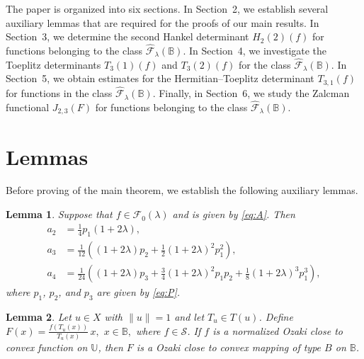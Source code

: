 \documentclass[11pt, reqno]{amsart}
\newtheorem{lem}{Lemma}[section]
\numberwithin{equation}{section}
\begin{document}
The paper is organized into six sections. In Section~2, we establish several
auxiliary lemmas that are required for the proofs of our main results.
In Section~3, we determine the second Hankel determinant
$H_{2}(2)(f)$ for functions belonging to the class
$\widehat{\mathcal{F}}_{\lambda}(\mathbb{B})$. In Section~4, we investigate
the Toeplitz determinants $T_{3}(1)(f)$ and $T_{3}(2)(f)$ for the class
$\widehat{\mathcal{F}}_{\lambda}(\mathbb{B})$. In Section~5, we obtain
estimates for the Hermitian--Toeplitz determinant $T_{3,1}(f)$ for functions
in the class $\widehat{\mathcal{F}}_{\lambda}(\mathbb{B})$. Finally, in
Section~6, we study the Zalcman functional $J_{2,3}(F)$ for functions
belonging to the class $\widehat{\mathcal{F}}_{\lambda}(\mathbb{B})$.
\section{{\bf Lemmas}}
Before proving of the main theorem, we establish the following auxiliary lemmas. 
\begin{lem}\label{L0}\cite[Lemma 2.4]{ALT2022}
Suppose that $f\in\mathcal{F}_{0}(\lambda)$ and is given by \eqref{eq:A}. Then
\begin{equation}\label{eq:coefficients}
\begin{aligned}
a_2 &= \frac{1}{4}p_1(1+2\lambda),\\[2mm]
a_3 &= \frac{1}{12}\left((1+2\lambda)p_2+\frac{1}{2}(1+2\lambda)^2p_1^2\right),\\[2mm]
a_4 &= \frac{1}{24}\left((1+2\lambda)p_3
+\frac{3}{4}(1+2\lambda)^2p_1p_2
+\frac{1}{8}(1+2\lambda)^3p_1^3\right),
\end{aligned}
\end{equation}
where $p_1$, $p_2$, and $p_3$ are given by \eqref{eq:P}.
\end{lem}

\begin{lem}\label{L1}
Let \(u\in X\) with \(\|u\|=1\) and let \(T_u\in T(u)\). Define $F(x)=\frac{f(T_u(x))}{T_u(x)}\,x,$ $x\in\mathbb{B},$
where \(f\in\mathcal{S}\). If \(f\) is a normalized Ozaki close to convex function on \(\mathbb{U}\), then \(F\) is a Ozaki close to convex  mapping of type \(B\) on \(\mathbb{B}\).
\end{lem}
\end{document}
